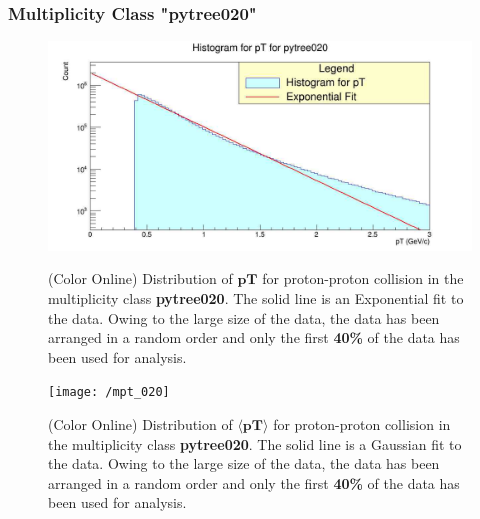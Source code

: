 \documentclass[letterpaper,aps,prc,superscriptaddress,nofootinbib,10pt,showpacs,floatfix]{revtex4-2}%
\begin{document}
\subsubsection{Multiplicity Class "pytree020"}
\label{subsubsec:020}
\vspace{-5mm}
\begin{figure}[!htb]
   \begin{minipage}{0.48\textwidth}
   \label{Fig:1a}
   \label{Fig:1b}
     \centering
     \renewcommand{\thefigure}{1a}
     \includegraphics[width=1.1\linewidth]{pt_020}
     \caption{(Color Online) Distribution of $\mathbf{pT}$ for proton-proton collision in the multiplicity class \textbf{pytree020}. The solid line is an Exponential fit to the data. Owing to the large size of the data, the data has been arranged in a random order and only the first \textbf{40\%} of the data has been used for analysis.}
   \end{minipage}\hfill
   \begin{minipage}{0.48\textwidth}
     \centering
     \renewcommand{\thefigure}{1b}
     \texttt{[image: /mpt\_020]}
     \caption{(Color Online) Distribution of $\mathbf{\langle pT\rangle }$ for proton-proton collision in the multiplicity class \textbf{pytree020}. The solid line is a Gaussian fit to the data. Owing to the large size of the data, the data has been arranged in a random order and only the first \textbf{40\%} of the data has been used for analysis.}
   \end{minipage}
\end{figure}

\FloatBarrier
\vspace{-3mm}
\pagebreak
\end{document}
